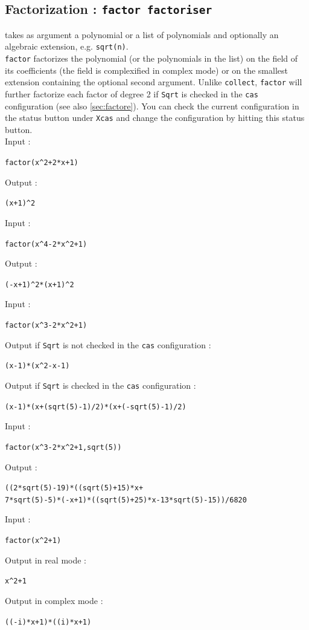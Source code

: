 \documentclass[a4paper,11pt]{book}
\begin{document}
\subsection{Factorization : {\tt factor factoriser}}\label{sec:factor}
 takes as argument a polynomial or a list of 
polynomials and optionally an algebraic extension, e.g. {\tt sqrt(n)}.\\
{\tt factor} factorizes the polynomial (or the polynomials in the list) on the
field of its coefficients (the field is complexified in complex mode)
or on the smallest extension containing the optional second argument.
Unlike {\tt collect},
{\tt factor} will further factorize each factor of degree 2
if {\tt Sqrt} is  checked in the {\tt cas} configuration
(see also \ref{sec:factore}).
You can check the current configuration in the status button under
{\tt Xcas} and change the configuration by hitting this status button.\\
Input :
 \begin{center}{\tt factor(x\verb|^|2+2*x+1)}\end{center}
Output :
\begin{center}{\tt (x+1)\verb|^|2}\end{center}
Input :
\begin{center}{\tt factor(x\verb|^|4-2*x\verb|^|2+1)}\end{center}
Output :
\begin{center}{\tt (-x+1)\verb|^|2*(x+1)\verb|^|2}\end{center}
Input :
 \begin{center}{\tt factor(x\verb|^|3-2*x\verb|^|2+1)}\end{center}
Output if {\tt Sqrt} is not checked in the {\tt cas} configuration :
\begin{center}{\tt  (x-1)*(x\verb|^|2-x-1)}\end{center}
Output if {\tt Sqrt} is  checked in the {\tt cas} configuration :
\begin{center}{\tt (x-1)*(x+(sqrt(5)-1)/2)*(x+(-sqrt(5)-1)/2)}\end{center}
Input :
 \begin{center}{\tt factor(x\verb|^|3-2*x\verb|^|2+1,sqrt(5))}\end{center}
Output :
\begin{center}{\tt ((2*sqrt(5)-19)*((sqrt(5)+15)*x+}\\
{\tt 7*sqrt(5)-5)*(-x+1)*((sqrt(5)+25)*x-13*sqrt(5)-15))/6820}
\end{center}
Input :
 \begin{center}{\tt factor(x\verb|^|2+1)}\end{center}
Output in real mode :
\begin{center}{\tt  x\verb|^|2+1}\end{center}
Output in complex mode :
\begin{center}{\tt  ((-i)*x+1)*((i)*x+1)}\end{center}
\end{document}
